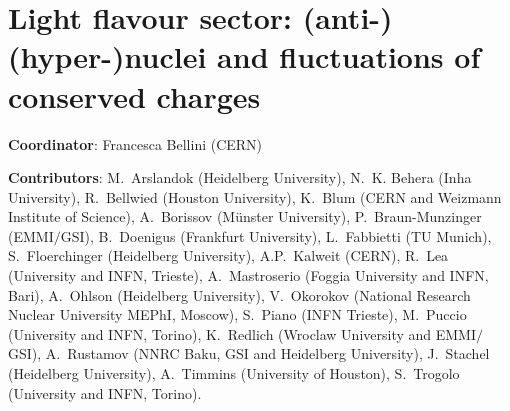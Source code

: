 \documentclass[../report.tex]{subfiles}
\providecommand{\main}{..}
\begin{document}
\clearpage
\section{Light flavour sector: (anti-)(hyper-)nuclei and fluctuations of conserved charges}
\label{sec:lf}

{ \small
\noindent \textbf{Coordinator}: Francesca Bellini (CERN)

\noindent \textbf{Contributors}: 
M.~Arslandok (Heidelberg University), 
N.~K. Behera (Inha University), 
R.~Bellwied (Houston University), 
K.~Blum (CERN and Weizmann Institute of Science), 
A.~Borissov (M\"{u}nster University), 
P.~Braun-Munzinger (EMMI$/$GSI), 
B.~Doenigus (Frankfurt University), 
L.~Fabbietti (TU Munich), 
S.~Floerchinger (Heidelberg University), 
A.P.~Kalweit (CERN), 
R.~Lea (University and INFN, Trieste), 
A.~Mastroserio (Foggia University and INFN, Bari),
A.~Ohlson (Heidelberg University), 
V.~Okorokov (National Research Nuclear University MEPhI, Moscow), 
S.~Piano (INFN Trieste), 
M.~Puccio (University and INFN, Torino), 
K.~Redlich (Wroclaw University and EMMI$/$GSI), 
A.~Rustamov (NNRC Baku, GSI and Heidelberg University), 
J.~Stachel (Heidelberg University), 
A.~Timmins (University of Houston),
S.~Trogolo (University and INFN, Torino).
}





%
\end{document}
